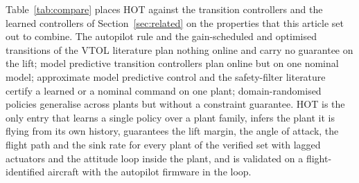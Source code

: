 Table~\ref{tab:compare} places HOT against the transition controllers and the learned controllers of Section~\ref{sec:related} on the properties that this article set out to combine. The autopilot rule and the gain-scheduled and optimised transitions of the VTOL literature plan nothing online and carry no guarantee on the lift; model predictive transition controllers plan online but on one nominal model; approximate model predictive control and the safety-filter literature certify a learned or a nominal command on one plant; domain-randomised policies generalise across plants but without a constraint guarantee. HOT is the only entry that learns a single policy over a plant family, infers the plant it is flying from its own history, guarantees the lift margin, the angle of attack, the flight path and the sink rate for every plant of the verified set with lagged actuators and the attitude loop inside the plant, and is validated on a flight-identified aircraft with the autopilot firmware in the loop.

